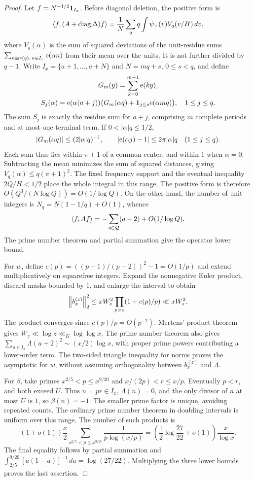 \begin{proof}
Let $f=N^{-1/2}\mathbf 1_{I_x}$. Before diagonal deletion, the positive form is
\[
\langle f,(A+\operatorname{diag}\Delta)f\rangle=\frac1N\sum_q q\int\psi_+(v)V_q(v/H)\,dv,
\]
where $V_q(\alpha)$ is the sum of squared deviations of the unit-residue sums
$\sum_{n\equiv r(q),\,n\in I_x}\mathrm e(\alpha n)$ from their mean over the units. It is not further divided by $q-1$. Write
$I_x=\{a+1,\ldots,a+N\}$ and $N=mq+s$, $0\le s<q$, and define
\[
\begin{gathered}
G_m(y)=\sum_{k=0}^{m-1}\mathrm e(ky),\\
S_j(\alpha)=\mathrm e(\alpha(a+j))\bigl(G_m(\alpha q)+\mathbf 1_{j\le s}\mathrm e(\alpha mq)\bigr),
\quad1\le j\le q.
\end{gathered}
\]
The sum $S_j$ is exactly the residue sum for $a+j$, comprising $m$ complete periods and at most one terminal term. If $0<|\alpha|q\le1/2$,
\[
|G_m(\alpha q)|\le(2|\alpha|q)^{-1},\qquad
|\mathrm e(\alpha j)-1|\le2\pi|\alpha|q\quad(1\le j\le q).
\]
Each sum thus lies within $\pi+1$ of a common center, and within $1$ when $\alpha=0$. Subtracting the mean minimizes the sum of squared distances, giving $V_q(\alpha)\le q(\pi+1)^2$. The fixed frequency support and the eventual inequality $2Q/H<1/2$ place the whole integral in this range. The positive form is therefore
$O(Q^3/(N\log Q))=O(1/\log Q)$.
On the other hand, the number of unit integers is $N_q=N(1-1/q)+O(1)$, whence
\[
\langle f,Af\rangle=-\sum_{q\in\mathcal Q}(q-2)+O(1/\log Q).
\]
The prime number theorem and partial summation give the operator lower bound.

For $w$, define $c(p)=((p-1)/(p-2))^2-1=O(1/p)$ and extend multiplicatively on squarefree integers. Expand the nonnegative Euler product, discard masks bounded by $1$, and enlarge the interval to obtain
\[
\left\|b_x^{(z)}\right\|_2^2\le xW_z^2\prod_{p>z}(1+c(p)/p)\ll xW_z^2.
\]
The product converges since $c(p)/p=O(p^{-2})$. Mertens' product theorem gives
$W_z\ll\log z\ll_K\log\log x$. The prime number theorem also gives
$\sum_{u\in I_x}\Lambda(u+2)^2\sim(x/2)\log x$, with proper prime powers contributing a lower-order term. The two-sided triangle inequality for norms proves the asymptotic for $w$, without assuming orthogonality between $b_x^{(z)}$ and $\Lambda$.

For $\beta$, take primes $x^{2/5}<p\le x^{9/20}$ and $x/(2p)<r\le x/p$. Eventually $p<r$, and both exceed $U$. Thus $n=pr\in I_x$, $\Lambda(n)=0$, and the only divisor of $n$ at most $U$ is $1$, so $\beta(n)=-1$. The smaller prime factor is unique, avoiding repeated counts. The ordinary prime number theorem in doubling intervals is uniform over this range. The number of such products is
\[
(1+o(1))\frac x2\sum_{x^{2/5}<p\le x^{9/20}}\frac1{p\log(x/p)}
=\left(\frac12\log\frac{27}{22}+o(1)\right)\frac x{\log x}.
\]
The final equality follows by partial summation and
$\int_{2/5}^{9/20}[a(1-a)]^{-1}\,da=\log(27/22)$.
Multiplying the three lower bounds proves the last assertion.
\end{proof}

